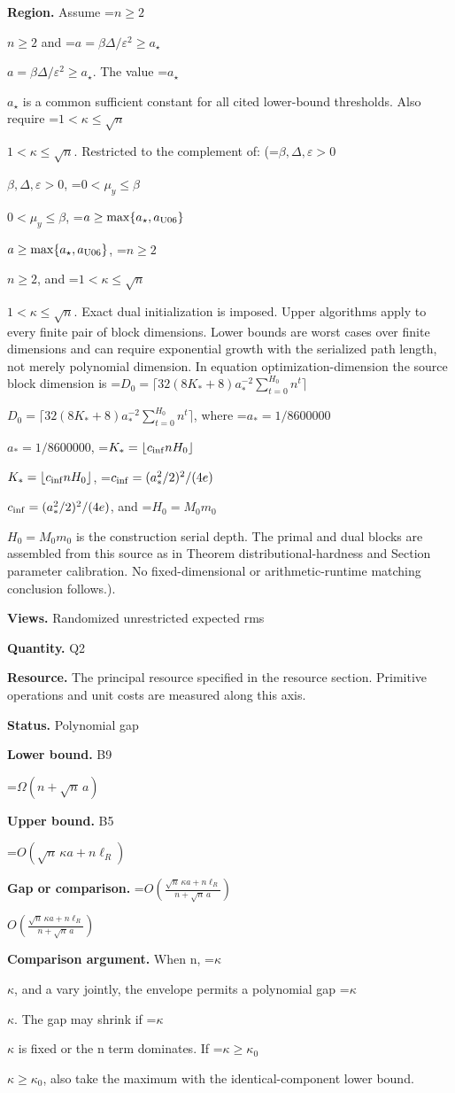 \documentclass[10pt,a4paper]{article}
\newcommand{\AtlasMath}[1]{\par\begingroup\centering\setbox0=\hbox{$\displaystyle #1$}\ifdim\wd0>1.4\linewidth\typeout{ATLAS WIDE FORMULA: \the\wd0}\fi\ifdim\wd0>\linewidth\resizebox{\linewidth}{!}{\box0}\else\box0\fi\par\endgroup}
\newcommand{\AtlasInlineMath}[1]{\begingroup\setbox0=\hbox{$#1$}\ifdim\wd0>.4\linewidth\endgroup\AtlasMath{#1}\else\endgroup$#1$\fi}
\begin{document}
\textbf{Region.} Assume \AtlasInlineMath{n\ge2} and \AtlasInlineMath{a=\beta\Delta/\varepsilon^2\ge a_\star}. The value \AtlasInlineMath{a_\star} is a common sufficient constant for all cited lower-bound thresholds. Also require \AtlasInlineMath{1<\kappa\le\sqrt n}. Restricted to the complement of: (\AtlasInlineMath{\beta,\Delta,\varepsilon>0}, \AtlasInlineMath{0<\mu_y\le\beta}, \AtlasInlineMath{a\ge\max\{a_\star,a_{\rm U06}\}}, \AtlasInlineMath{n\ge2}, and \AtlasInlineMath{1<\kappa\le\sqrt n}. Exact dual initialization is imposed. Upper algorithms apply to every finite pair of block dimensions. Lower bounds are worst cases over finite dimensions and can require exponential growth with the serialized path length, not merely polynomial dimension. In equation optimization-dimension the source block dimension is \AtlasInlineMath{D_0=\lceil32(8K_*+8)a_*^{-2}\sum_{t=0}^{H_0}n^t\rceil}, where \AtlasInlineMath{a_*=1/8600000}, \AtlasInlineMath{K_*=\lfloor c_{\rm inf}nH_0\rfloor}, \AtlasInlineMath{c_{\rm inf}=(a_*^2/2)^2/(4e)}, and \AtlasInlineMath{H_0=M_0m_0} is the construction serial depth. The primal and dual blocks are assembled from this source as in Theorem distributional-hardness and Section parameter calibration. No fixed-dimensional or arithmetic-runtime matching conclusion follows.).



\textbf{Views.} Randomized unrestricted expected rms



\textbf{Quantity.} Q2



\textbf{Resource.} The principal resource specified in the resource section. Primitive operations and unit costs are measured along this axis.



\textbf{Status.} Polynomial gap



\textbf{Lower bound.} B9



\AtlasMath{\Omega(n+\sqrt n\,a)}


\textbf{Upper bound.} B5



\AtlasMath{O(\sqrt n\,\kappa a+n\ell_R)}


\textbf{Gap or comparison.} \AtlasInlineMath{O\!\left(\frac{\sqrt n\,\kappa a+n\ell_R}{n+\sqrt n\,a}\right)}



\textbf{Comparison argument.} When n, \AtlasInlineMath{\kappa}, and a vary jointly, the envelope permits a polynomial gap \AtlasInlineMath{\kappa}. The gap may shrink if \AtlasInlineMath{\kappa} is fixed or the n term dominates. If \AtlasInlineMath{\kappa\ge\kappa_0}, also take the maximum with the identical-component lower bound.
\end{document}
